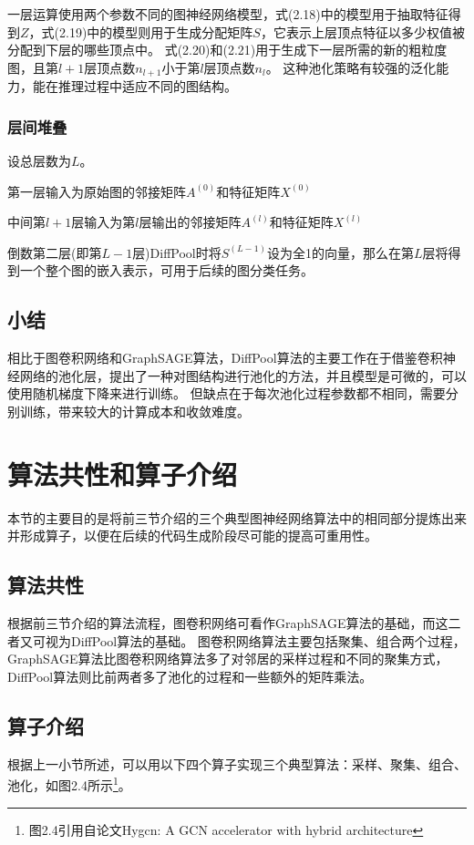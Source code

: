 一层运算使用两个参数不同的图神经网络模型，式(2.18)中的模型用于抽取特征得到$Z$，式(2.19)中的模型则用于生成分配矩阵$S$，它表示上层顶点特征以多少权值被分配到下层的哪些顶点中。
式(2.20)和(2.21)用于生成下一层所需的新的粗粒度图，且第$l+1$层顶点数$n_{l+1}$小于第$l$层顶点数$n_l$。
这种池化策略有较强的泛化能力，能在推理过程中适应不同的图结构。

\subsubsection{层间堆叠}
设总层数为$L$。

第一层输入为原始图的邻接矩阵$A^{(0)}$和特征矩阵$X^{(0)}$

中间第$l+1$层输入为第$l$层输出的邻接矩阵$A^{(l)}$和特征矩阵$X^{(l)}$

倒数第二层(即第$L-1$层)DiffPool时将$S^{(L-1)}$设为全1的向量，那么在第$L$层将得到一个整个图的嵌入表示，可用于后续的图分类任务。

\subsection{小结}
相比于图卷积网络和GraphSAGE算法，DiffPool算法的主要工作在于借鉴卷积神经网络的池化层，提出了一种对图结构进行池化的方法，并且模型是可微的，可以使用随机梯度下降来进行训练。
但缺点在于每次池化过程参数都不相同，需要分别训练，带来较大的计算成本和收敛难度。

\section{算法共性和算子介绍}
本节的主要目的是将前三节介绍的三个典型图神经网络算法中的相同部分提炼出来并形成算子，以便在后续的代码生成阶段尽可能的提高可重用性。

\subsection{算法共性}
根据前三节介绍的算法流程，图卷积网络可看作GraphSAGE算法的基础，而这二者又可视为DiffPool算法的基础。
图卷积网络算法主要包括聚集、组合两个过程，GraphSAGE算法比图卷积网络算法多了对邻居的采样过程和不同的聚集方式，DiffPool算法则比前两者多了池化的过程和一些额外的矩阵乘法。

\subsection{算子介绍}
根据上一小节所述，可以用以下四个算子实现三个典型算法：采样、聚集、组合、池化，如图2.4所示\footnote{图2.4引用自论文Hygcn: A GCN accelerator with hybrid architec­ture}。

